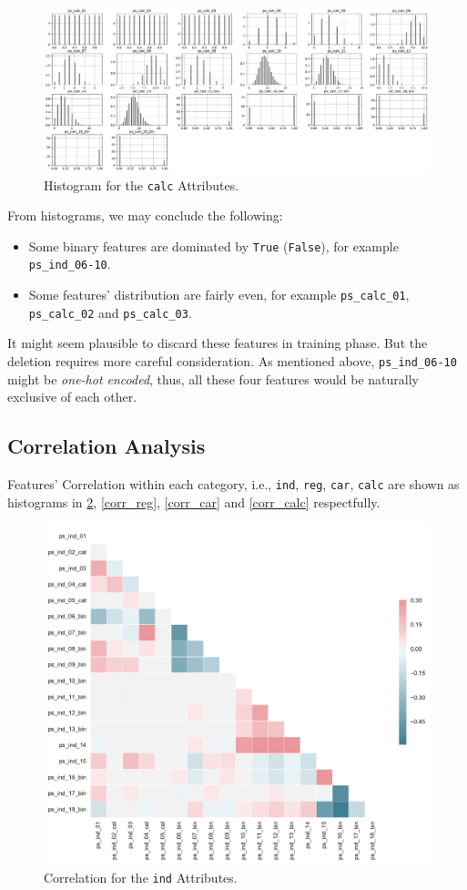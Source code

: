 \documentclass{standalone}
\begin{document}
\begin{figure}[!ht]
\centering
\includegraphics[width=\textwidth]{fig/calc_col.pdf}
\caption{Histogram for the \lstinline{calc} Attributes.}
\label{hist_calc}
\end{figure}

From histograms, we may conclude the following:
\begin{itemize}
\item Some binary features are dominated by \lstinline{True} (\lstinline{False}), for example \lstinline{ps_ind_06-10}.
\item Some features' distribution are fairly even, for example \lstinline{ps_calc_01}, \lstinline{ps_calc_02} and \lstinline{ps_calc_03}.
\end{itemize}

It might seem plausible to discard these features in training phase. But the deletion requires more careful consideration. As mentioned above, \lstinline{ps_ind_06-10} might be \emph{one-hot encoded}, thus, all these four features would be naturally exclusive of each other.

\subsection{Correlation Analysis}

Features' Correlation within each category, i.e., \lstinline{ind}, \lstinline{reg}, \lstinline{car}, \lstinline{calc} are shown as histograms in \cref{corr_ind}, \cref{corr_reg}, \cref{corr_car} and \cref{corr_calc} respectfully.


\begin{figure}[!t]
\centering
\includegraphics[width=.5\textwidth]{fig/corr_ind_col.pdf}
\caption{Correlation for the \lstinline{ind} Attributes.}
\label{corr_ind}
\end{figure}
\end{document}
